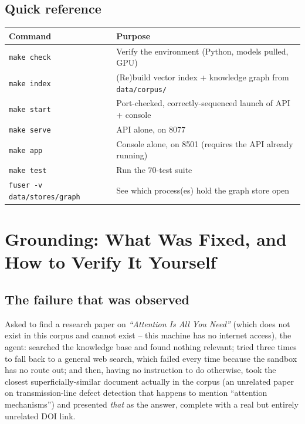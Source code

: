 \documentclass[11pt,a4paper]{article}
\newcommand{\code}[1]{\texttt{\small #1}}
\begin{document}
\subsection{Quick reference}

\begin{center}
\renewcommand{\arraystretch}{1.3}
\begin{tabularx}{\linewidth}{@{}l X@{}}
\toprule
\textbf{Command} & \textbf{Purpose} \\
\midrule
\code{make check} & Verify the environment (Python, models pulled, GPU) \\
\code{make index} & (Re)build vector index + knowledge graph from \code{data/corpus/} \\
\code{make start} & Port-checked, correctly-sequenced launch of API + console \\
\code{make serve} & API alone, on 8077 \\
\code{make app} & Console alone, on 8501 (requires the API already running) \\
\code{make test} & Run the 70-test suite \\
\code{fuser -v data/stores/graph} & See which process(es) hold the graph store open \\
\bottomrule
\end{tabularx}
\end{center}

\section{Grounding: What Was Fixed, and How to Verify It Yourself}\label{sec:grounding}

\subsection{The failure that was observed}

Asked to find a research paper on \emph{``Attention Is All You Need''} (which
does not exist in this corpus and cannot exist -- this machine has no internet
access), the agent: searched the knowledge base and found nothing relevant;
tried three times to fall back to a general web search, which failed every
time because the sandbox has no route out; and then, having no instruction to
do otherwise, took the closest superficially-similar document actually in the
corpus (an unrelated paper on transmission-line defect detection that happens
to mention ``attention mechanisms'') and presented \emph{that} as the answer,
complete with a real but entirely unrelated DOI link.
\end{document}
